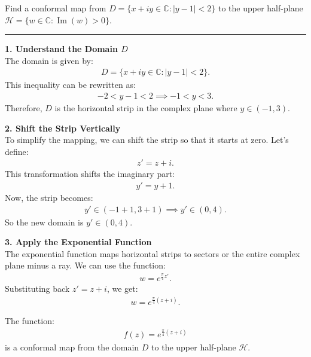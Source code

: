 \begin{example}

    Find a conformal map from $D = \{ x + iy \in \mathbb{C} : |y - 1| < 2 \}$ to the upper half-plane $\mathcal{H} = \{ w \in \mathbb{C} : \operatorname{Im}(w) > 0 \}$.

    \hrule
    \vspace{0.5cm}

    \textbf{1. Understand the Domain $D$} \\

    The domain is given by:
    \begin{align*}
        D = \{ x + iy \in \mathbb{C} : |y - 1| < 2 \}.
    \end{align*}
    This inequality can be rewritten as:
    \begin{align*}
        -2 < y - 1 < 2 \implies -1 < y < 3.
    \end{align*}
    Therefore, $D$ is the horizontal strip in the complex plane where $y \in (-1, 3)$.

    \textbf{2. Shift the Strip Vertically} \\

    To simplify the mapping, we can shift the strip so that it starts at zero. Let's define:
    \begin{align*}
        z' = z + i.
    \end{align*}
    This transformation shifts the imaginary part:
    \begin{align*}
        y' = y + 1.
    \end{align*}
    Now, the strip becomes:
    \begin{align*}
        y' \in (-1 + 1, 3 + 1) \implies y' \in (0, 4).
    \end{align*}
    So the new domain is $y' \in (0, 4)$.

    \textbf{3. Apply the Exponential Function} \\

    The exponential function maps horizontal strips to sectors or the entire complex plane minus a ray. We can use the function:
    \begin{align*}
        w = e^{\frac{\pi}{4} z'}.
    \end{align*}
    Substituting back $z' = z + i$, we get:
    \begin{align*}
        w = e^{\frac{\pi}{4} (z + i)}.
    \end{align*}

    The function:
    \begin{align*}
        f(z) = e^{\frac{\pi}{4} (z + i)}
    \end{align*}
    is a conformal map from the domain $D$ to the upper half-plane $\mathcal{H}$.
\end{example}

